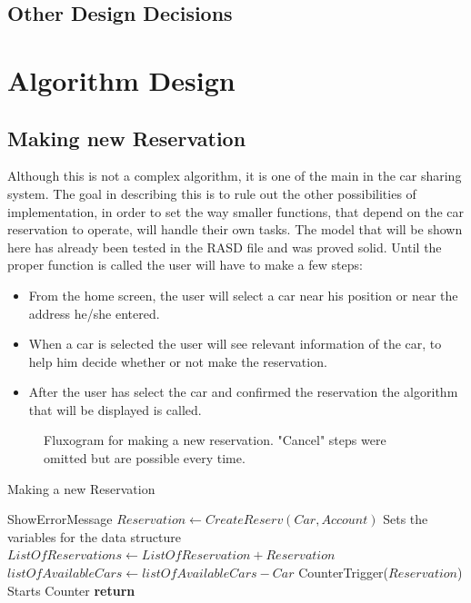 \documentclass[a4paper]{article}
\begin{document}
\subsection{Other Design Decisions}

\newpage
\section{Algorithm Design}
\subsection{Making new Reservation}

Although this is not a complex algorithm, it is one of the main in the car sharing system. The goal in describing this is to rule out the other possibilities of implementation, in order to set the way smaller functions, that depend on the car reservation to operate, will handle their own tasks. The model that will be shown here has already been tested in the RASD file and was proved solid. \newline
Until the proper function is called the user will have to make a few steps:
\begin{itemize} 
\item From the home screen, the user will select a car near his position or near the address he/she entered.
\item  When a car is selected the user will see relevant information of the car, to help him decide whether or not make the reservation.
\item After the user has select the car and confirmed the reservation the algorithm that will be displayed is called.
\end{itemize}
\begin{figure}[h]
\centering
\vspace*{\fill}
\noindent{}%
\caption {Fluxogram for making a new reservation. "Cancel" steps were omitted but are possible every time.}
\vspace*{0.2cm}
\end{figure}

\begin{algorithm}
\caption{Making a new Reservation}\label{MakeReserv}
\begin{algorithmic}[1]

	\State ShowErrorMessage
\Else
\State $Reservation \leftarrow CreateReserv(Car, Account)$ \Comment Sets the variables for the data structure
\State $ListOfReservations \leftarrow ListOfReservation + Reservation$
\State $listOfAvailableCars \leftarrow listOfAvailableCars - Car$
\State CounterTrigger($Reservation$) \Comment Starts Counter
\EndIf
\State \textbf{return} 
\EndProcedure
\end{algorithmic}
\end{algorithm}
\end{document}
